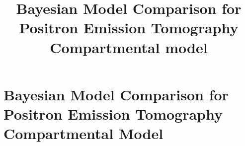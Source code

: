 \ifx\inthesis\undefined %

\title{Bayesian Model Comparison for Positron Emission Tomography
  Compartmental model}

\maketitle
\else %
\chapter{Bayesian Model Comparison for Positron Emission Tomography
  Compartmental Model}
\label{cha:Bayesian Model Comparison for Positron Emission Tomography
  Compartmental Model}
\fi %


\ifx\inthesis\undefined
\printbibliography
\else\relax\fi

